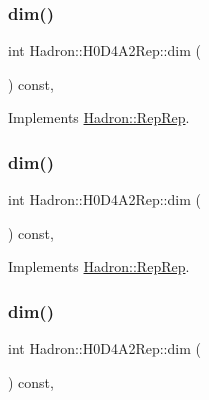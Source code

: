 \subsubsection{\texorpdfstring{dim()}{dim()}\hspace{0.1cm}{\footnotesize\ttfamily [3/5]}}
{\footnotesize\ttfamily int Hadron\+::\+H0\+D4\+A2\+Rep\+::dim (\begin{DoxyParamCaption}{ }\end{DoxyParamCaption}) const\hspace{0.3cm}{\ttfamily [inline]}, {\ttfamily [virtual]}}



Implements \mbox{\hyperlink{structHadron_1_1RepRep_a92c8802e5ed7afd7da43ccfd5b7cd92b}{Hadron\+::\+Rep\+Rep}}.

\mbox{\label{structHadron_1_1H0D4A2Rep_ab746308c018d06bc8d3e1822f84c9049}} 
\subsubsection{\texorpdfstring{dim()}{dim()}\hspace{0.1cm}{\footnotesize\ttfamily [4/5]}}
{\footnotesize\ttfamily int Hadron\+::\+H0\+D4\+A2\+Rep\+::dim (\begin{DoxyParamCaption}{ }\end{DoxyParamCaption}) const\hspace{0.3cm}{\ttfamily [inline]}, {\ttfamily [virtual]}}



Implements \mbox{\hyperlink{structHadron_1_1RepRep_a92c8802e5ed7afd7da43ccfd5b7cd92b}{Hadron\+::\+Rep\+Rep}}.

\mbox{\label{structHadron_1_1H0D4A2Rep_ab746308c018d06bc8d3e1822f84c9049}} 
\subsubsection{\texorpdfstring{dim()}{dim()}\hspace{0.1cm}{\footnotesize\ttfamily [5/5]}}
{\footnotesize\ttfamily int Hadron\+::\+H0\+D4\+A2\+Rep\+::dim (\begin{DoxyParamCaption}{ }\end{DoxyParamCaption}) const\hspace{0.3cm}{\ttfamily [inline]}, {\ttfamily [virtual]}}



